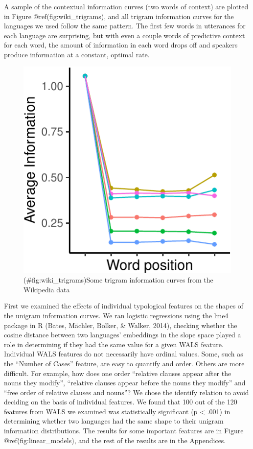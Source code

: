 \documentclass[man,floatsintext]{apa6}
\begin{document}
A sample of the contextual information curves (two words of context) are plotted in Figure @ref(fig:wiki\_trigrams), and all trigram information curves for the languages we used follow the same pattern. The first few words in utterances for each language are surprising, but with even a couple words of predictive context for each word, the amount of information in each word drops off and speakers produce information at a constant, optimal rate.

\begin{figure}
\centering
\includegraphics{figs/wiki_trigrams-1.pdf}
\caption{(\#fig:wiki\_trigrams)Some trigram information curves from the Wikipedia data}
\end{figure}

First we examined the effects of individual typological features on the shapes of the unigram information curves. We ran logistic regressions using the lme4 package in R (Bates, Mächler, Bolker, \& Walker, 2014), checking whether the cosine distance between two languages' embeddings in the slope space played a role in determining if they had the same value for a given WALS feature. Individual WALS features do not necessarily have ordinal values. Some, such as the \enquote{Number of Cases} feature, are easy to quantify and order. Others are more difficult. For example, how does one order \enquote{relative clauses appear after the nouns they modify}, \enquote{relative clauses appear before the nouns they modify} and \enquote{free order of relative clauses and nouns}? We chose the identify relation to avoid deciding on the basis of individual features. We found that 100 out of the 120 features from WALS we examined was statistically significant (p \textless{} .001) in determining whether two languages had the same shape to their unigram information distributions. The results for some important features are in Figure @ref(fig:linear\_models), and the rest of the results are in the Appendices.
\end{document}

